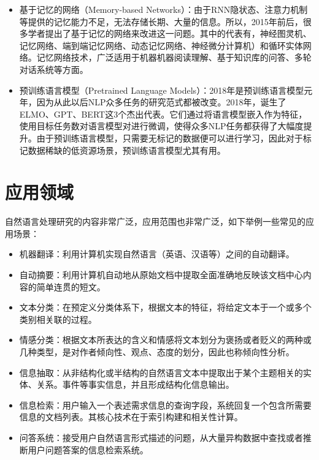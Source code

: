 \begin{enumerate}
\begin{itemize}
    \item 基于记忆的网络（Memory-based Networks）：由于RNN隐状态、注意力机制等提供的记忆能力不足，无法存储长期、大量的信息。所以，2015年前后，很多学者提出了基于记忆的网络来改进这一问题。其中的代表有，神经图灵机\cite{graves2014neural}、记忆网络\cite{weston2014memory}、端到端记忆网络\cite{sukhbaatar2015end}、动态记忆网络\cite{kumar2016ask}、神经微分计算机\cite{graves2016hybrid}）和循环实体网络\cite{henaff2016tracking}。记忆网络技术，广泛适用于机器机器阅读理解、基于知识库的问答、多轮对话系统等方面。
    \item 预训练语言模型（Pretrained Language Models）：2018年是预训练语言模型元年，因为从此以后NLP众多任务的研究范式都被改变。2018年，诞生了ELMO\cite{peters2018deep}、GPT\cite{radford2018improving}、BERT\cite{devlin2018bert}这3个杰出代表。它们通过将语言模型嵌入作为特征，使用目标任务数对语言模型对进行微调，使得众多NLP任务都获得了大幅度提升。由于预训练语言模型，只需要无标记的数据便可以进行学习，因此对于标记数据稀缺的低资源场景，预训练语言模型尤其有用。
\end{itemize}

\end{enumerate}

\section{应用领域}
自然语言处理研究的内容非常广泛，应用范围也非常广泛，如下举例一些常见的应用场景：
\begin{itemize}
\item 机器翻译：利用计算机实现自然语言（英语、汉语等）之间的自动翻译。
\item 自动摘要：利用计算机自动地从原始文档中提取全面准确地反映该文档中心内容的简单连贯的短文。
\item 文本分类：在预定义分类体系下，根据文本的特征，将给定文本于一个或多个类别相关联的过程。
\item 情感分类：根据文本所表达的含义和情感将文本划分为褒扬或者贬义的两种或几种类型，是对作者倾向性、观点、态度的划分，因此也称倾向性分析。
\item 信息抽取：从非结构化或半结构的自然语言文本中提取出于某个主题相关的实体、关系。事件等事实信息，并且形成结构化信息输出。
\item 信息检索：用户输入一个表述需求信息的查询字段，系统回复一个包含所需要信息的文档列表。其核心技术在于索引构建和相关性计算。
\item 问答系统：接受用户自然语言形式描述的问题，从大量异构数据中查找或者推断用户问题答案的信息检索系统。
\end{itemize}

